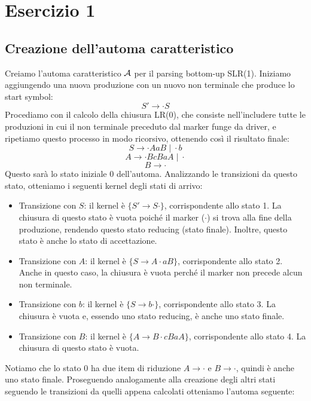 \documentclass[11pt]{article}
\begin{document}
\section{Esercizio 1}
\subsection{Creazione dell'automa caratteristico}
Creiamo l'automa caratteristico $\cal A$ per il parsing bottom-up SLR(1). Iniziamo aggiungendo 
una nuova produzione con un nuovo non terminale che produce lo start symbol: 
$$ S'\rightarrow \cdot S $$ 
Procediamo con il calcolo della chiusura LR(0), che consiste nell'includere 
tutte le produzioni in cui il non terminale preceduto dal marker funge da 
driver, e ripetiamo questo processo in modo ricorsivo, ottenendo così il 
risultato finale:
$$ S \rightarrow \cdot AaB\;|\;\cdot b $$
$$ A \rightarrow \cdot BcBaA \; | \; \cdot $$
$$ B \rightarrow \cdot $$
Questo sarà lo stato iniziale 0 dell'automa. Analizzando le transizioni da 
questo stato, otteniamo i seguenti kernel degli stati di arrivo:

\begin{itemize}
  \item Transizione con $S$: il kernel è $\{ S' \rightarrow S \cdot \}$, corrispondente allo stato 1. 
  La chiusura di questo stato è vuota poiché il marker ($\cdot$) si trova alla fine della produzione, 
  rendendo questo stato reducing (stato finale). Inoltre, questo stato è anche lo stato di accettazione.
  
  \item Transizione con $A$: il kernel è $\{ S \rightarrow A \cdot aB \}$, corrispondente allo stato 2. 
  Anche in questo caso, la chiusura è vuota perché il marker non precede alcun non terminale.
  
  \item Transizione con $b$: il kernel è $\{ S \rightarrow b \cdot \}$, corrispondente allo stato 3. 
  La chiusura è vuota e, essendo uno stato reducing, è anche uno stato finale.
  
  \item Transizione con $B$: il kernel è $\{ A \rightarrow B \cdot cBaA \}$, corrispondente allo stato 4.
  La chiusura di questo stato è vuota.
\end{itemize}

\noindent Notiamo che lo stato 0 ha due item di riduzione $A \rightarrow \cdot$ e $B \rightarrow \cdot$, 
quindi è anche uno stato finale. Proseguendo analogamente alla creazione degli altri stati seguendo le 
transizioni da quelli appena calcolati otteniamo l'automa seguente:
\end{document}
